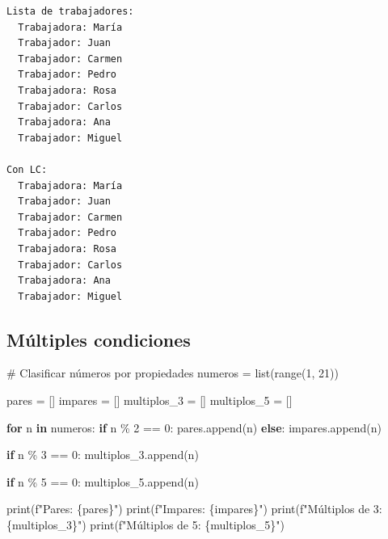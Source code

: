 \documentclass[
  doc,
  floatsintext,
  longtable,
  a4paper,
  nolmodern,
  notxfonts,
  notimes,
  12pt,
  colorlinks=true,linkcolor=blue,citecolor=blue,urlcolor=blue]{apa7}
\newenvironment{Shaded}{\begin{snugshade}}{\end{snugshade}}
\newcommand{\BuiltInTok}[1]{\textcolor[rgb]{0.00,0.23,0.31}{#1}}
\newcommand{\CommentTok}[1]{\textcolor[rgb]{0.37,0.37,0.37}{#1}}
\newcommand{\ControlFlowTok}[1]{\textcolor[rgb]{0.00,0.23,0.31}{\textbf{#1}}}
\newcommand{\DecValTok}[1]{\textcolor[rgb]{0.68,0.00,0.00}{#1}}
\newcommand{\KeywordTok}[1]{\textcolor[rgb]{0.00,0.23,0.31}{\textbf{#1}}}
\newcommand{\NormalTok}[1]{\textcolor[rgb]{0.00,0.23,0.31}{#1}}
\newcommand{\OperatorTok}[1]{\textcolor[rgb]{0.37,0.37,0.37}{#1}}
\newcommand{\SpecialCharTok}[1]{\textcolor[rgb]{0.37,0.37,0.37}{#1}}
\newcommand{\SpecialStringTok}[1]{\textcolor[rgb]{0.13,0.47,0.30}{#1}}
\begin{document}
\begin{verbatim}
Lista de trabajadores:
  Trabajadora: María
  Trabajador: Juan
  Trabajador: Carmen
  Trabajador: Pedro
  Trabajadora: Rosa
  Trabajador: Carlos
  Trabajadora: Ana
  Trabajador: Miguel

Con LC:
  Trabajadora: María
  Trabajador: Juan
  Trabajador: Carmen
  Trabajador: Pedro
  Trabajadora: Rosa
  Trabajador: Carlos
  Trabajadora: Ana
  Trabajador: Miguel
\end{verbatim}

\subsection{Múltiples condiciones}\label{muxfaltiples-condiciones}

\begin{Shaded}
\begin{Highlighting}[]
\CommentTok{\# Clasificar números por propiedades}
\NormalTok{numeros }\OperatorTok{=} \BuiltInTok{list}\NormalTok{(}\BuiltInTok{range}\NormalTok{(}\DecValTok{1}\NormalTok{, }\DecValTok{21}\NormalTok{))}

\NormalTok{pares }\OperatorTok{=}\NormalTok{ []}
\NormalTok{impares }\OperatorTok{=}\NormalTok{ []}
\NormalTok{multiplos\_3 }\OperatorTok{=}\NormalTok{ []}
\NormalTok{multiplos\_5 }\OperatorTok{=}\NormalTok{ []}

\ControlFlowTok{for}\NormalTok{ n }\KeywordTok{in}\NormalTok{ numeros:}
    \ControlFlowTok{if}\NormalTok{ n }\OperatorTok{\%} \DecValTok{2} \OperatorTok{==} \DecValTok{0}\NormalTok{:}
\NormalTok{        pares.append(n)}
    \ControlFlowTok{else}\NormalTok{:}
\NormalTok{        impares.append(n)}
    
    \ControlFlowTok{if}\NormalTok{ n }\OperatorTok{\%} \DecValTok{3} \OperatorTok{==} \DecValTok{0}\NormalTok{:}
\NormalTok{        multiplos\_3.append(n)}
    
    \ControlFlowTok{if}\NormalTok{ n }\OperatorTok{\%} \DecValTok{5} \OperatorTok{==} \DecValTok{0}\NormalTok{:}
\NormalTok{        multiplos\_5.append(n)}

\BuiltInTok{print}\NormalTok{(}\SpecialStringTok{f"Pares: }\SpecialCharTok{\{}\NormalTok{pares}\SpecialCharTok{\}}\SpecialStringTok{"}\NormalTok{)}
\BuiltInTok{print}\NormalTok{(}\SpecialStringTok{f"Impares: }\SpecialCharTok{\{}\NormalTok{impares}\SpecialCharTok{\}}\SpecialStringTok{"}\NormalTok{)}
\BuiltInTok{print}\NormalTok{(}\SpecialStringTok{f"Múltiplos de 3: }\SpecialCharTok{\{}\NormalTok{multiplos\_3}\SpecialCharTok{\}}\SpecialStringTok{"}\NormalTok{)}
\BuiltInTok{print}\NormalTok{(}\SpecialStringTok{f"Múltiplos de 5: }\SpecialCharTok{\{}\NormalTok{multiplos\_5}\SpecialCharTok{\}}\SpecialStringTok{"}\NormalTok{)}
\end{Highlighting}
\end{Shaded}
\end{document}
